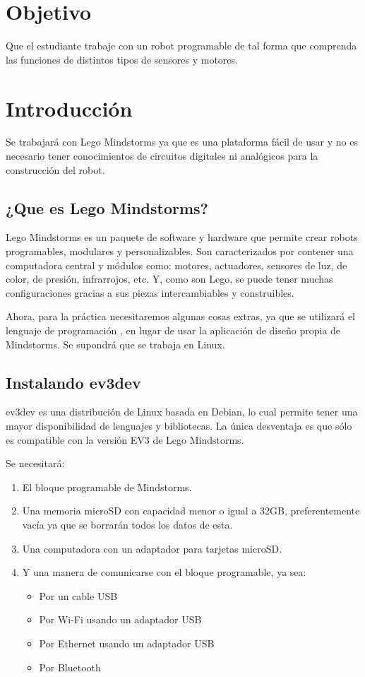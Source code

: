 
\section{Objetivo}
\noindent Que el estudiante trabaje con un robot programable de tal forma que comprenda las funciones de distintos tipos de sensores y motores.

\section{Introducci\'on}

Se trabajará con Lego Mindstorms ya que es una plataforma fácil de usar y no es necesario tener conocimientos de circuitos digitales ni analógicos para la construcción del robot.

\subsection{¿Que es Lego Mindstorms?}

Lego Mindstorms es un paquete de software y hardware que permite crear robots programables, modulares y personalizables. Son caracterizados por contener una computadora central y módulos como: motores, actuadores, sensores de luz, de color, de presión, infrarrojos, etc. Y, como son Lego, se puede tener muchas configuraciones gracias a sus piezas intercambiables y construibles.


Ahora, para la práctica necesitaremos algunas cosas extras, ya que se utilizará el lenguaje de programación , en lugar de usar la aplicación de diseño propia de Mindstorms. Se supondrá que se trabaja en Linux.

\subsection{Instalando ev3dev}

ev3dev es una distribución de Linux basada en Debian, lo cual permite tener una mayor disponibilidad de lenguajes y bibliotecas. La única desventaja es que sólo es compatible con la versión EV3 de Lego Mindstorms.

\noindent Se necesitará:

\begin{enumerate}
  \item El bloque programable de Mindstorms.
  \item Una memoria microSD con capacidad menor o igual a 32GB, preferentemente vacía ya que se borrarán todos los datos de esta.
  \item Una computadora con un adaptador para tarjetas microSD.
  \item Y una manera de comunicarse con el bloque programable, ya sea:
      \begin{itemize}
        \item Por un cable USB
        \item Por Wi-Fi usando un adaptador USB
        \item Por Ethernet usando un adaptador USB
        \item Por Bluetooth
      \end{itemize}
\end{enumerate}

